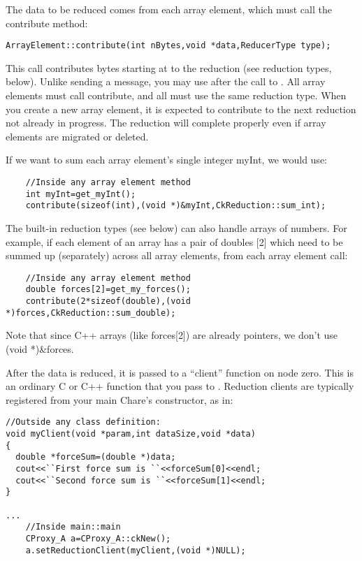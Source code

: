 The data to be reduced comes from each array element, which must call the contribute method:
\begin{verbatim}
ArrayElement::contribute(int nBytes,void *data,ReducerType type);
\end{verbatim}

This call contributes  bytes starting at  to the reduction  (see reduction types, below).  Unlike sending a message, you may use  after the call to .  All array elements must call contribute, and all must use the same reduction type.  When you create a new array element, it is expected to contribute to the next reduction not already in progress.  The reduction will complete properly even if array elements are migrated or deleted.

If we want to sum each array element's single integer myInt, we would use:
\begin{verbatim}
    //Inside any array element method
    int myInt=get_myInt();
    contribute(sizeof(int),(void *)&myInt,CkReduction::sum_int);
\end{verbatim}

The built-in reduction types (see below) can also handle arrays of numbers.  For example, if each element of an array has a pair of doubles [2] which need to be summed up (separately) across all array elements, from each array element call:
\begin{verbatim}
    //Inside any array element method
    double forces[2]=get_my_forces();
    contribute(2*sizeof(double),(void *)forces,CkReduction::sum_double);
\end{verbatim}
Note that since C++ arrays (like forces[2]) are already pointers, we don't use (void *)\&forces.


After the data is reduced, it is passed to a ``client'' function on node zero.  This is an ordinary C or C++ function that you pass to .  Reduction clients are typically registered from your main Chare's constructor, as in:

\begin{verbatim}
//Outside any class definition:
void myClient(void *param,int dataSize,void *data)
{
  double *forceSum=(double *)data;
  cout<<``First force sum is ``<<forceSum[0]<<endl;
  cout<<``Second force sum is ``<<forceSum[1]<<endl;
}

...
    //Inside main::main
    CProxy_A a=CProxy_A::ckNew();
    a.setReductionClient(myClient,(void *)NULL);
\end{verbatim}

